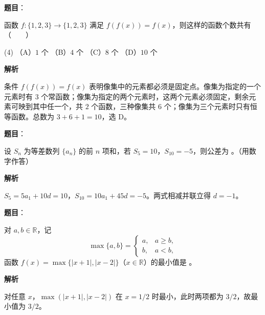 \begin{answer}

\textbf{题目}：

函数 $f:\{1,2,3\}\to\{1,2,3\}$ 满足 $f(f(x))=f(x)$，则这样的函数个数共有\mbox{（　　）}

\begin{gkopts}(4)
\task （A）$1$ 个
\task （B）$4$ 个
\task （C）$8$ 个
\task （D）$10$ 个
\end{gkopts}

\textbf{解析}

条件 $f(f(x))=f(x)$ 表明像集中的元素都必须是固定点。像集为指定的一个元素时有 $3$ 个常函数；像集为指定的两个元素时，这两个元素必须固定，剩余元素可映到其中任一个，共 $2$ 个函数，三种像集共 $6$ 个；像集为三个元素时只有恒等函数。总数为 $3+6+1=10$，选 D。


\end{answer}
\begin{answer}

\textbf{题目}：

设 $S_n$ 为等差数列 $\{a_n\}$ 的前 $n$ 项和，若 $S_5=10$，$S_{10}=-5$，则公差为 \gkblank{}。（用数字作答）

\textbf{解析}

$S_5=5a_1+10d=10$，$S_{10}=10a_1+45d=-5$。两式相减并联立得 $d=-1$。


\end{answer}
\begin{answer}

\textbf{题目}：

对 $a,b\in\mathbb R$，记
\nopagebreak[4]
\[
\max\{a,b\}=\begin{cases}
a,&a\geqslant b,\\
b,&a<b,
\end{cases}
\]
函数 $f(x)=\max\{|x+1|,|x-2|\}$（$x\in\mathbb R$）的最小值是 \gkblank{}。

\textbf{解析}

对任意 $x$，$\max(|x+1|,|x-2|)$ 在 $x=1/2$ 时最小，此时两项都为 $3/2$，故最小值为 $3/2$。


\end{answer}
